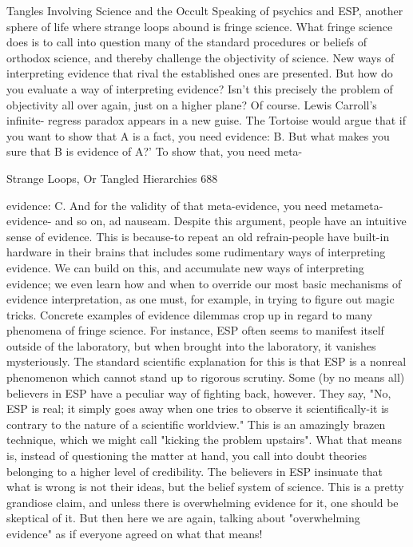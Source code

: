                    Tangles Involving Science and the Occult
Speaking of psychics and ESP, another sphere of life where strange loops abound is
fringe science. What fringe science does is to call into question many of the standard
procedures or beliefs of orthodox science, and thereby challenge the objectivity of
science. New ways of interpreting evidence that rival the established ones are presented.
But how do you evaluate a way of interpreting evidence? Isn't this precisely the problem
of objectivity all over again, just on a higher plane? Of course. Lewis Carroll's infinite-
regress paradox appears in a new guise. The Tortoise would argue that if you want to
show that A is a fact, you need evidence: B. But what makes you sure that B is evidence
of A?' To show that, you need meta-




Strange Loops, Or Tangled Hierarchies                                                   688

evidence: C. And for the validity of that meta-evidence, you need metameta-evidence-
and so on, ad nauseam. Despite this argument, people have an intuitive sense of evidence.
This is because-to repeat an old refrain-people have built-in hardware in their brains that
includes some rudimentary ways of interpreting evidence. We can build on this, and
accumulate new ways of interpreting evidence; we even learn how and when to override
our most basic mechanisms of evidence interpretation, as one must, for example, in trying
to figure out magic tricks.
        Concrete examples of evidence dilemmas crop up in regard to many phenomena
of fringe science. For instance, ESP often seems to manifest itself outside of the
laboratory, but when brought into the laboratory, it vanishes mysteriously. The standard
scientific explanation for this is that ESP is a nonreal phenomenon which cannot stand up
to rigorous scrutiny. Some (by no means all) believers in ESP have a peculiar way of
fighting back, however. They say, "No, ESP is real; it simply goes away when one tries
to observe it scientifically-it is contrary to the nature of a scientific worldview." This is
an amazingly brazen technique, which we might call "kicking the problem upstairs".
What that means is, instead of questioning the matter at hand, you call into doubt theories
belonging to a higher level of credibility. The believers in ESP insinuate that what is
wrong is not their ideas, but the belief system of science. This is a pretty grandiose claim,
and unless there is overwhelming evidence for it, one should be skeptical of it. But then
here we are again, talking about "overwhelming evidence" as if everyone agreed on what
that means!

